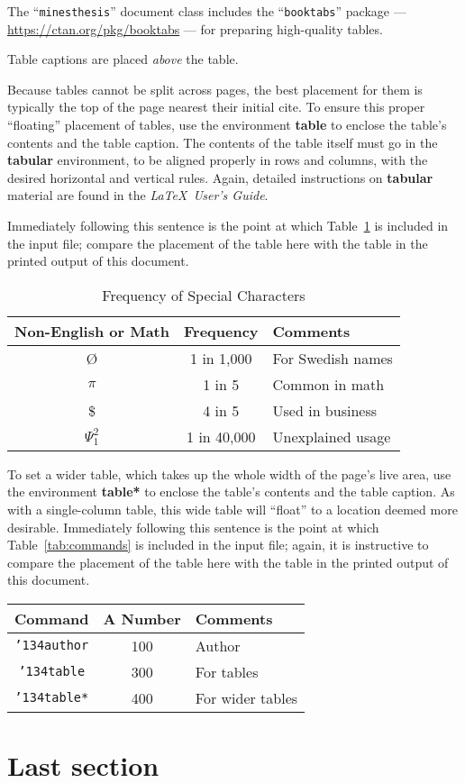The ``\verb|minesthesis|'' document class includes the ``\verb|booktabs|''
package --- \url{https://ctan.org/pkg/booktabs} --- for preparing
high-quality tables.

Table captions are placed {\itshape above} the table.

Because tables cannot be split across pages, the best placement for
them is typically the top of the page nearest their initial cite.  To
ensure this proper ``floating'' placement of tables, use the
environment \textbf{table} to enclose the table's contents and the
table caption.  The contents of the table itself must go in the
\textbf{tabular} environment, to be aligned properly in rows and
columns, with the desired horizontal and vertical rules.  Again,
detailed instructions on \textbf{tabular} material are found in the
\textit{\LaTeX\ User's Guide}.

Immediately following this sentence is the point at which
Table~\ref{tab:freq} is included in the input file; compare the
placement of the table here with the table in the printed output of
this document.

\begin{table}
	\caption{Frequency of Special Characters}
	\label{tab:freq}
	\centering
	\begin{tabular}{ccl}
		\toprule
		Non-English or Math&Frequency&Comments\\
		\midrule
		\O & 1 in 1,000& For Swedish names\\
		$\pi$ & 1 in 5& Common in math\\
		\$ & 4 in 5 & Used in business\\
		$\Psi^2_1$ & 1 in 40,000& Unexplained usage\\
		\bottomrule
	\end{tabular}
\end{table}

To set a wider table, which takes up the whole width of the page's
live area, use the environment \textbf{table*} to enclose the table's
contents and the table caption.  As with a single-column table, this
wide table will ``float'' to a location deemed more
desirable. Immediately following this sentence is the point at which
Table~\ref{tab:commands} is included in the input file; again, it is
instructive to compare the placement of the table here with the table
in the printed output of this document.

\begin{table*}
	\caption{Some Typical Commands}
	\label{tab:commands}
	\centering
	\begin{tabular}{ccl}
		\toprule
		Command &A Number & Comments\\
		\midrule
		\texttt{{\char'134}author} & 100& Author \\
		\texttt{{\char'134}table}& 300 & For tables\\
		\texttt{{\char'134}table*}& 400& For wider tables\\
		\bottomrule
	\end{tabular}
\end{table*}

\section{Last section}
\lipsum[6-7]